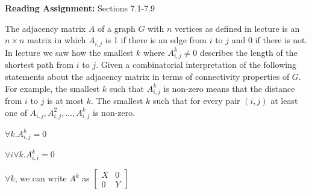 \documentclass[12pt,twoside]{article}
\begin{document}
\noindent \textbf{Reading Assignment:}   Sections 7.1-7.9
\\


\begin{problem}{20}
    The adjacency matrix $A$ of a graph $G$ with $n$ vertices as defined in lecture is an $n \times n$
    matrix in which $A_{i,j}$ is 1 if there is an edge from $i$ to $j$ and 0 if there is not.
    In lecture we saw how 
    the smallest $k$ where $A^k_{i,j} \neq 0$ describes the length
    of the shortest path from $i$ to $j$. Given a combinatorial interpretation of the following statements about the adjacency matrix in terms of connectivity properties of $G$. For example, the smallest $k$ such that $A^k_{i,j}$ is non-zero means that the distance from $i$ to $j$ is at most $k$. 
\bparts
{}
    The smallest $k$ such that for every pair $(i,j)$ at least one of
    $A_{i,j}, A_{i,j}^2, \dots , A^k_{i,j}$ is non-zero.

    $\forall k. A^{k}_{i,j} = 0$

    $\forall i \forall k. A^{k}_{i,i} = 0$

$\forall k$, we can write $A^k$ as $\left[ \begin{array}{cc}
                                            X & 0 \\
                                            0 & Y 
                                    \end{array} \right]$

\eparts
\end{problem}
\end{document}
